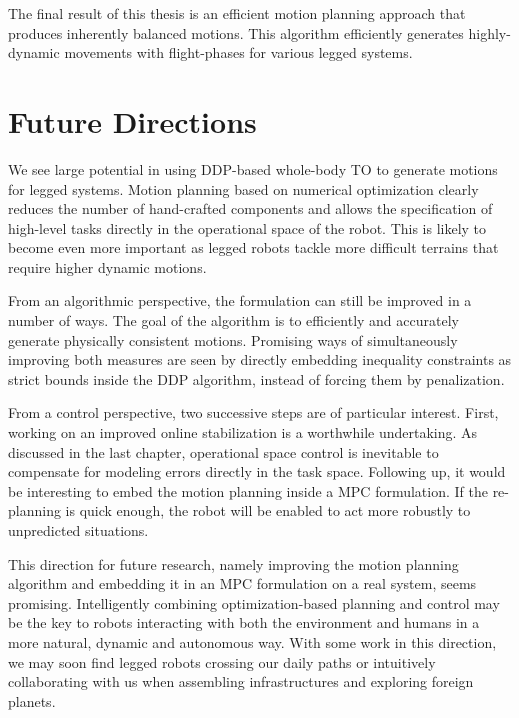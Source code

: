 The final result of this thesis is an efficient motion planning approach that produces inherently balanced motions. This algorithm efficiently generates highly-dynamic movements with flight-phases for various legged systems. 

\section{Future Directions}
We see large potential in using \gls{DDP}-based whole-body \gls{TO} to generate motions for legged systems. Motion planning based on numerical optimization clearly reduces the number of hand-crafted components and allows the specification of high-level tasks directly in the operational space of the robot. This is likely to become even more important as legged robots tackle more difficult terrains that require higher dynamic motions.
  
From an algorithmic perspective, the formulation can still be improved in a number of ways. The goal of the algorithm is to efficiently and accurately generate physically consistent motions. Promising ways of simultaneously improving both measures are seen by directly embedding inequality constraints as strict bounds inside the \gls{DDP} algorithm, instead of forcing them by penalization.

From a control perspective, two successive steps are of particular interest. First, working on an improved online stabilization is a worthwhile undertaking. As discussed in the last chapter, operational space control is inevitable to compensate for modeling errors directly in the task space. Following up, it would be interesting to embed the motion planning inside a \gls{MPC} formulation. If the re-planning is quick enough, the robot will be enabled to act more robustly to unpredicted situations. 

This direction for future research, namely improving the motion planning algorithm and embedding it in an \gls{MPC} formulation on a real system, seems promising. Intelligently combining optimization-based planning and control may be the key to robots interacting with both the environment and humans in a more natural, dynamic and autonomous way. With some work in this direction, we may soon find legged robots crossing our daily paths or intuitively collaborating with us when assembling infrastructures and exploring foreign planets. 